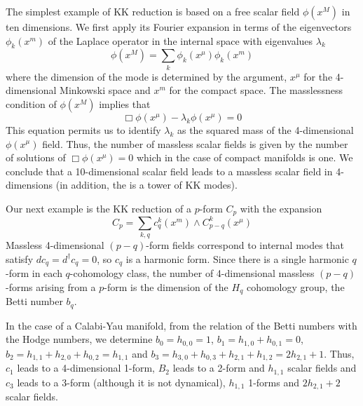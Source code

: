 The simplest example of KK reduction is based on a free scalar field $\phi(x^M)$ in ten dimensions.
We first apply its Fourier expansion in terms of the eigenvectors $\phi_k(x^m)$ of the Laplace operator in the internal space  with eigenvalues $\lambda_k$
\begin{equation}
  \phi(x^M)= \sum_k \phi_k(x^\mu)\phi_k(x^m)
\end{equation}
where the dimension of the mode is determined by the argument, $x^\mu$ for the 4-dimensional Minkowski space and $x^m$ for the compact space.
The masslessness condition of $\phi(x^M)$ implies that
\begin{equation}
 \Box \phi(x^\mu) - \lambda_k \phi(x^\mu)=0 
\end{equation}
This equation permits us to identify $\lambda_k$  as the squared mass of the 4-dimensional $\phi(x^\mu)$ field.
Thus, the number of massless scalar fields is given by the number of solutions of $\Box \phi(x^\mu)=0$ which in the
case of compact manifolds is one.
We conclude that a 10-dimensional scalar field leads to a massless scalar field in 4-dimensions (in addition, the is a tower of KK modes).

Our next example is the KK reduction of a $p$-form $C_p$ with the expansion 
\begin{equation}
  C_p=\sum_{k,q} c_q^k(x^m)\wedge C^k_{p-q}(x^\mu)
\end{equation}
Massless 4-dimensional $(p-q)$-form fields correspond to internal modes that satisfy $dc_q=d^\dagger c_q=0$, so 
$c_q$ is a harmonic form.
Since there is a single harmonic $q$-form in each $q$-cohomology class, 
the number of 4-dimensional massless $(p-q)$-forms arising from a $p$-form is the dimension of the $H_q$ cohomology group, the 
Betti number $b_q$.

In the case of a Calabi-Yau manifold, from the relation of the Betti numbers with the Hodge numbers,
we determine $b_0=h_{0,0}=1$, $b_1=h_{1,0}+h_{0,1}=0$, $b_2=h_{1,1}+h_{2,0}+h_{0,2}=h_{1,1}$ and
$b_3=h_{3,0}+h_{0,3}+h_{2,1}+h_{1,2}=2h_{2,1}+1$.
Thus, $c_1$ leads to a 4-dimensional 1-form, 
$B_2$ leads to a 2-form and  $h_{1,1}$ scalar fields 
and $c_3$ leads to a 3-form (although it is not dynamical), $h_{1,1}$ 1-forms and $2h_{2,1}+2$ scalar fields.

